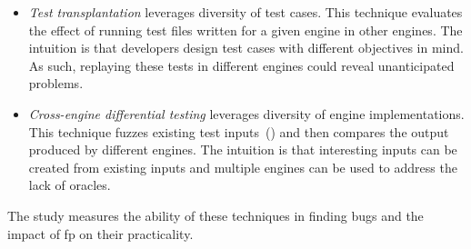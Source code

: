 \begin{itemize}[topsep=0pt,parsep=0pt,partopsep=2pt,labelwidth=0cm,align=left,itemindent=-0.25cm]
\item \emph{Test transplantation} leverages diversity of test
  cases. This technique evaluates the effect of running test files
  written for a given engine in other engines. The intuition is that
  developers design test cases with different objectives in mind. As
  such, replaying these tests in different engines could reveal
  unanticipated problems.

\item \emph{Cross-engine differential testing} leverages diversity of
  engine implementations. This technique fuzzes existing test
  inputs~(\citeauthor{fuzz-testing-history}) and then compares the output
  produced by different engines.%
  The intuition is that interesting inputs can be created
  from existing inputs and multiple engines can be used to address the
  lack of oracles.
\end{itemize}

The study measures the ability of these techniques in finding bugs and
the impact of \gls{fp} on their practicality.


